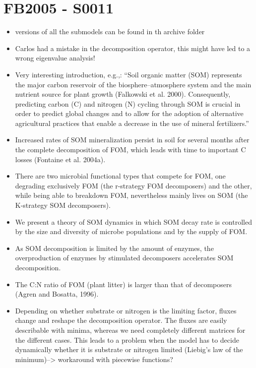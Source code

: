 \documentclass[american, 12pt]{article}
\newcommand{\red}[1]{{\color{red}#1}}
\begin{document}
\section{FB2005 - S0011}
\cite{Fontaine2005Ecologyletters}
\begin{itemize}
  \item versions of all the submodels can be found in th archive folder
  \item \red{Carlos had a mistake in the decomposition operator, this might have led to a wrong eigenvalue analysis!}
  \item Very interesting introduction, e.g.,: ``Soil organic matter (SOM) represents the major carbon reservoir of the biosphere–atmosphere system and the main nutrient source for plant growth (Falkowski et al. 2000). Consequently, predicting carbon (C) and nitrogen (N) cycling through SOM is crucial in order to predict global changes and to allow for the adoption of alternative agricultural practices that enable a decrease in the use of mineral fertilizers.''
  \item Increased rates of SOM mineralization persist in soil for several months after the complete decomposition of FOM, which leads with time to important C losses (Fontaine et al. 2004a).
  \item There are two microbial functional types that compete for FOM, one degrading exclusively FOM (the r-strategy FOM decomposers) and the other, while being able to breakdown FOM, nevertheless mainly lives on SOM (the K-strategy SOM decomposers).
  \item We present a theory of SOM dynamics in which SOM decay rate is controlled by the size and diversity of microbe populations and by the supply of FOM.
  \item As SOM decomposition is limited by the amount of enzymes, the overproduction of enzymes by stimulated decomposers accelerates SOM decomposition.
  \item The C:N ratio of FOM (plant litter) is larger than that of decomposers (Agren and Bosatta, 1996).
  \item \red{Depending on whether substrate or nitrogen is the limiting factor, fluxes change and reshape the decomposition operator. The fluxes are easily describable with minima, whereas we need completely different matrices for the different cases. This leads to a problem when the model has to decide dynamically whether it is substrate or nitrogen limited (Liebig's law of the minimum)--> workaround with piecewise functions?}
\end{itemize}
 
\printbibliography
\end{document}

